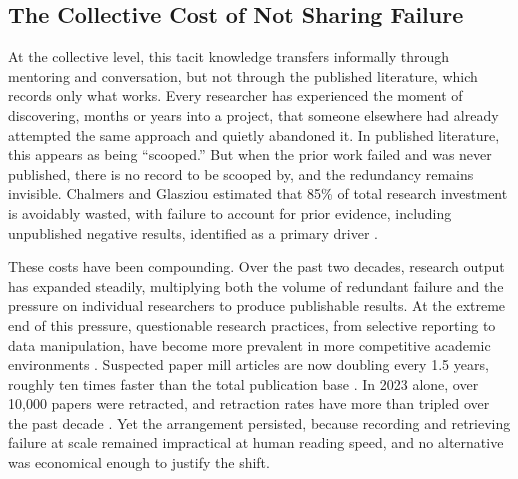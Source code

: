\subsection{The Collective Cost of Not Sharing Failure}

At the collective level, this tacit knowledge transfers informally
through mentoring and conversation, but not through the published
literature, which records only what works. Every researcher has
experienced the moment of discovering, months or years into a
project, that someone elsewhere had already attempted the same
approach and quietly abandoned it. In published literature, this
appears as being ``scooped.'' But when the prior work failed and
was never published, there is no record to be scooped by, and the
redundancy remains invisible. Chalmers and Glasziou estimated that
85\% of total research investment is avoidably wasted, with failure
to account for prior evidence, including unpublished negative
results, identified as a primary driver
\citep{chalmers2009avoidable}.

These costs have been compounding. Over the past two decades,
research output has expanded steadily, multiplying both the volume
of redundant failure and the pressure on individual researchers to
produce publishable results. At the extreme end of this pressure,
questionable research practices, from selective reporting to data
manipulation, have become more prevalent in more competitive
academic environments \citep{fanelli2010pressures}. Suspected paper
mill articles are now doubling every 1.5 years, roughly ten times
faster than the total publication base \citep{richardson2025pnas}.
In 2023 alone, over 10,000 papers were retracted, and retraction
rates have more than tripled over the past decade
\citep{noorden2023retraction}. Yet the arrangement persisted,
because recording and retrieving failure at scale remained
impractical at human reading speed, and no alternative was
economical enough to justify the shift.